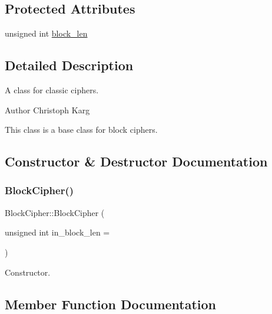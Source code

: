 \subsection*{Protected Attributes}
\begin{DoxyCompactItemize}
\item 
unsigned int \hyperlink{classBlockCipher_ab29ee03262fd620cd0659e860972faf0}{block\+\_\+len}
\end{DoxyCompactItemize}


\subsection{Detailed Description}
A class for classic ciphers. \begin{DoxyAuthor}{Author}
Christoph Karg
\end{DoxyAuthor}
This class is a base class for block ciphers. 

\subsection{Constructor \& Destructor Documentation}
\mbox{\label{classBlockCipher_a3c95996f1004e8bbf2b681168d1bd0a9}} 
\subsubsection{\texorpdfstring{Block\+Cipher()}{BlockCipher()}}
{\footnotesize\ttfamily Block\+Cipher\+::\+Block\+Cipher (\begin{DoxyParamCaption}\item[{unsigned int}]{in\+\_\+block\+\_\+len = {} }\end{DoxyParamCaption})}

Constructor. 

\subsection{Member Function Documentation}
\mbox{\label{classBlockCipher_a8a401652231a372a0ec248ff0fb5487a}} 
